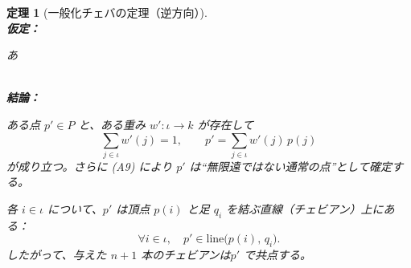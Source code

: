 \documentclass[a4paper,12pt]{bxjsbook}
\theoremstyle{theorem}
\newtheorem{theorem}{定理}[chapter]
\begin{document}
\begin{theorem}[一般化チェバの定理（逆方向）]
        \noindent\textbf{\\仮定：}\par
        \begin{theoremenumerate}[label=(A\arabic*), leftmargin=4em, topsep=2pt, partopsep=0pt, itemsep=0pt, parsep=0pt]
            \item あ
        \end{theoremenumerate}

        \noindent\textbf{\\結論：}\par
        \begin{theoremenumerate}[label=(C\arabic*), leftmargin=4em, topsep=2pt, partopsep=0pt, itemsep=0pt, parsep=0pt]
            \item ある点 $p'\in P$ と、ある重み $w':\iota\to k$ が存在して
                \[
                    \sum_{j\in\iota} w'(j)=1,
                    \qquad
                    p'=\sum_{j\in\iota} w'(j)\,p(j)
                \]
                が成り立つ。さらに (A9) により $p'$ は“無限遠ではない通常の点”として確定する。
            \item 各 $i\in\iota$ について、$p'$ は頂点 $p(i)$ と足 $q_i$ を結ぶ直線（チェビアン）上にある：
                \[
                    \forall i\in\iota,\quad
                    p' \in \mathrm{line}\big(p(i),\,q_i\big).
                \]
                したがって、与えた $n+1$ 本のチェビアンは$p'$ で共点する。
        \end{theoremenumerate}
    \end{theorem}
\end{document}
